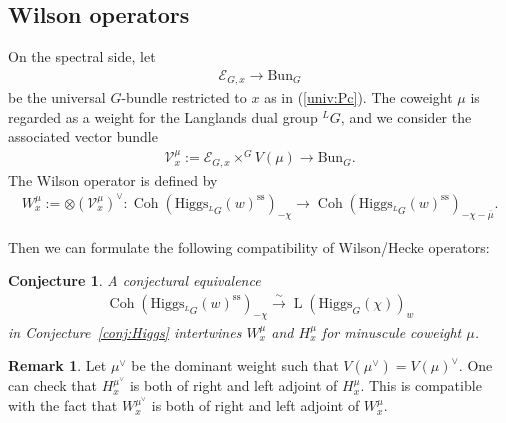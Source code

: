 \documentclass [11pt,oneside,a4paper,mathscr]{amsart}
\newtheorem{conj}[thm]{Conjecture}
\theoremstyle{definition}
\newtheorem{remark}[thm]{Remark}
\newcommand{\LL}{\operatorname{L}}
\newcommand{\Coh}{\operatorname{Coh}}
\newcommand{\Hig}{\mathrm{Higgs}}
\newcommand{\Bun}{\mathrm{Bun}}
\begin{document}
\subsection{Wilson operators}
On the spectral side, let 
\begin{align*}
    \mathscr{E}_{G, x}\to \Bun_G
\end{align*}
be the universal $G$-bundle restricted to $x$ as in (\ref{univ:Pc}).
The coweight $\mu$ is regarded as a weight for the Langlands dual group $^{L}G$, 
and we consider the associated vector bundle 
\begin{align*}
    \mathcal{V}_{x}^{\mu} :=\mathscr{E}_{G, x}\times^{G} V(\mu) \to \Bun_G. 
\end{align*}
The Wilson operator is defined by 
\begin{align*}
W_x^{\mu} :=
    \otimes (\mathcal{V}_{x}^{\mu})^{\vee} \colon \Coh(\Hig_{^{L}G}(w)^{\mathrm{ss}})_{-\chi}
    \to \Coh(\Hig_{^{L}G}(w)^{\mathrm{ss}})_{-\chi-\overline{\mu}}.
\end{align*}

Then we can formulate the following compatibility of Wilson/Hecke operators: 
\begin{conj}\label{conj:Hecke}
A
conjectural equivalence 
\begin{align*}
    \Coh(\Hig_{^{L}G}(w)^{\mathrm{ss}})_{-\chi} \stackrel{\sim}{\to} 
    \LL(\Hig_{G}(\chi))_{w}
\end{align*}
in Conjecture~\ref{conj:Higgs}
intertwines $W_x^{\mu}$ and $H_x^{\mu}$ for minuscule coweight $\mu$. 
\end{conj}

\begin{remark}\label{rmk:adjoint}
Let $\mu^{\vee}$ be the dominant weight such that $V(\mu^{\vee})=V(\mu)^{\vee}$. 
One can check that $H_{x}^{\mu^{\vee}}$ is both of right and left adjoint of 
$H_x^{\mu}$. This is compatible with the fact that $W_{x}^{\mu^{\vee}}$ is both of right and left adjoint of 
$W_x^{\mu}$.  
\end{remark}
\end{document}
